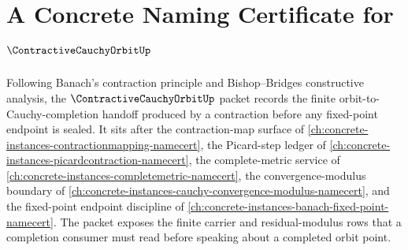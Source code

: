 \chapter{A Concrete Naming Certificate for $\ContractiveCauchyOrbitUp$}
\label{ch:concrete-instances-contractive-cauchy-orbit-namecert}

Following Banach's contraction principle and Bishop--Bridges constructive analysis, the $\ContractiveCauchyOrbitUp$ packet records the finite orbit-to-Cauchy-completion handoff produced by a contraction before any fixed-point endpoint is sealed. It sits after the contraction-map surface of \autoref{ch:concrete-instances-contractionmapping-namecert}, the Picard-step ledger of \autoref{ch:concrete-instances-picardcontraction-namecert}, the complete-metric service of \autoref{ch:concrete-instances-completemetric-namecert}, the convergence-modulus boundary of \autoref{ch:concrete-instances-cauchy-convergence-modulus-namecert}, and the fixed-point endpoint discipline of \autoref{ch:concrete-instances-banach-fixed-point-namecert}. The packet exposes the finite carrier and residual-modulus rows that a completion consumer must read before speaking about a completed orbit point.

